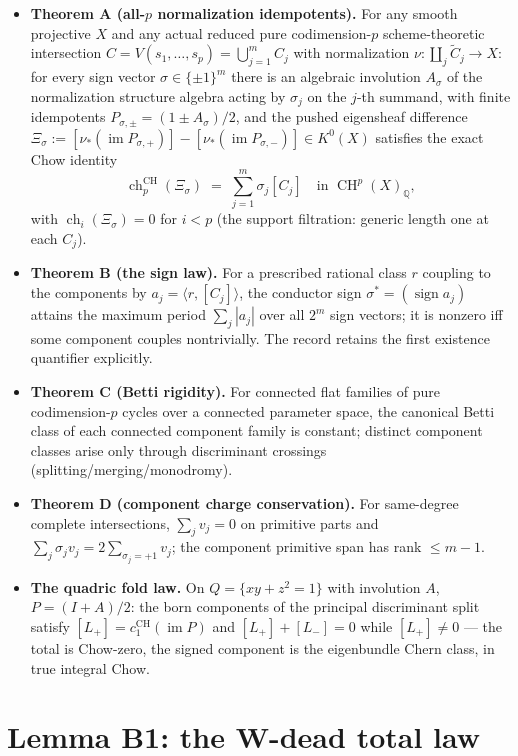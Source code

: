 \documentclass[11pt]{article}
\newcommand{\ch}{\operatorname{ch}}
\newcommand{\CH}{\operatorname{CH}}
\begin{document}
\begin{itemize}
\item \textbf{Theorem A (all-$p$ normalization idempotents).} For any smooth
projective $X$ and any actual reduced pure codimension-$p$ scheme-theoretic
intersection $C = V(s_1,\dots,s_p) = \bigcup_{j=1}^m C_j$ with normalization
$\nu: \coprod_j \widetilde C_j \to X$: for every sign vector
$\sigma \in \{\pm1\}^m$ there is an algebraic involution $A_\sigma$ of the
normalization structure algebra acting by $\sigma_j$ on the $j$-th summand,
with finite idempotents $P_{\sigma,\pm} = (1 \pm A_\sigma)/2$, and the pushed
eigensheaf difference $\Xi_\sigma := [\nu_*(\operatorname{im}P_{\sigma,+})] -
[\nu_*(\operatorname{im}P_{\sigma,-})] \in K^0(X)$ satisfies the exact Chow
identity
\[
\ch^{\CH}_p(\Xi_\sigma) \;=\; \sum_{j=1}^m \sigma_j [C_j]
\quad\text{in } \CH^p(X)_{\mathbb Q},
\]
with $\ch_i(\Xi_\sigma) = 0$ for $i < p$ (the support filtration:
generic length one at each $C_j$).
\item \textbf{Theorem B (the sign law).} For a prescribed rational class $r$
coupling to the components by $a_j = \langle r, [C_j]\rangle$, the conductor
sign $\sigma^* = (\operatorname{sign} a_j)$ attains the maximum period
$\sum_j |a_j|$ over all $2^m$ sign vectors; it is nonzero iff some component
couples nontrivially. The record retains the first existence quantifier
explicitly.
\item \textbf{Theorem C (Betti rigidity).} For connected flat families of
pure codimension-$p$ cycles over a connected parameter space, the canonical
Betti class of each connected component family is constant; distinct component
classes arise only through discriminant crossings
(splitting/merging/monodromy).
\item \textbf{Theorem D (component charge conservation).} For same-degree
complete intersections, $\sum_j v_j = 0$ on primitive parts and
$\sum_j \sigma_j v_j = 2\sum_{\sigma_j = +1} v_j$; the component primitive
span has rank $\le m-1$.
\item \textbf{The quadric fold law.} On $Q = \{xy + z^2 = 1\}$ with
involution $A$, $P = (I+A)/2$: the born components of the principal
discriminant split satisfy $[L_+] = c_1^{\CH}(\operatorname{im}P)$ and
$[L_+] + [L_-] = 0$ while $[L_+] \ne 0$ --- the total is Chow-zero, the
signed component is the eigenbundle Chern class, in true integral Chow.
\end{itemize}

\section{Lemma B1: the W-dead total law}
\end{document}
